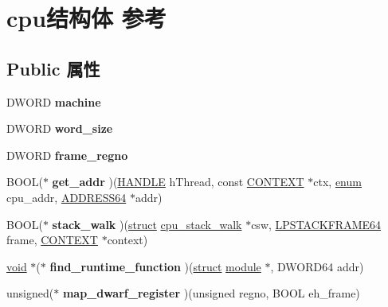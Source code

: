\hypertarget{structcpu}{}\section{cpu结构体 参考}
\label{structcpu}
\subsection*{Public 属性}
\begin{DoxyCompactItemize}
\item 
\mbox{\label{structcpu_abd2e019ddba9a1eaa55b4604481b56e0}} 
D\+W\+O\+RD {\bfseries machine}
\item 
\mbox{\label{structcpu_a17d3822f659180e35db0ed53b9fef3f1}} 
D\+W\+O\+RD {\bfseries word\+\_\+size}
\item 
\mbox{\label{structcpu_a5d038c6f1c12e5a6b2e7d1a4ec55b7ec}} 
D\+W\+O\+RD {\bfseries frame\+\_\+regno}
\item 
\mbox{\label{structcpu_aaed599fb963c1d62cebd4609235045a5}} 
B\+O\+OL($\ast$ {\bfseries get\+\_\+addr} )(\hyperlink{interfacevoid}{H\+A\+N\+D\+LE} h\+Thread, const \hyperlink{struct___c_o_n_t_e_x_t}{C\+O\+N\+T\+E\+XT} $\ast$ctx, \hyperlink{interfaceenum}{enum} cpu\+\_\+addr, \hyperlink{struct__tag_a_d_d_r_e_s_s64}{A\+D\+D\+R\+E\+S\+S64} $\ast$addr)
\item 
\mbox{\label{structcpu_a35496eeaa5fa18fd1f6fe7913589a3c9}} 
B\+O\+OL($\ast$ {\bfseries stack\+\_\+walk} )(\hyperlink{interfacestruct}{struct} \hyperlink{structcpu__stack__walk}{cpu\+\_\+stack\+\_\+walk} $\ast$csw, \hyperlink{struct___s_t_a_c_k_f_r_a_m_e64}{L\+P\+S\+T\+A\+C\+K\+F\+R\+A\+M\+E64} frame, \hyperlink{struct___c_o_n_t_e_x_t}{C\+O\+N\+T\+E\+XT} $\ast$context)
\item 
\mbox{\label{structcpu_a5ea45546313e295d7ebc18c490f2ded6}} 
\hyperlink{interfacevoid}{void} $\ast$($\ast$ {\bfseries find\+\_\+runtime\+\_\+function} )(\hyperlink{interfacestruct}{struct} \hyperlink{structmodule}{module} $\ast$, D\+W\+O\+R\+D64 addr)
\item 
\mbox{\label{structcpu_afba903707280a64358a92250712f91da}} 
unsigned($\ast$ {\bfseries map\+\_\+dwarf\+\_\+register} )(unsigned regno, B\+O\+OL eh\+\_\+frame)

\end{DoxyCompactItemize}
